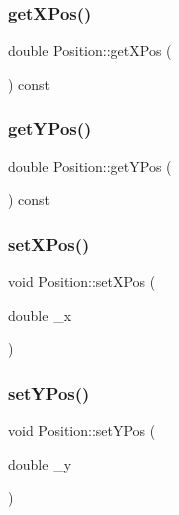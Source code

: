 \subsubsection{\texorpdfstring{get\+X\+Pos()}{getXPos()}}
{\footnotesize\ttfamily double Position\+::get\+X\+Pos (\begin{DoxyParamCaption}{ }\end{DoxyParamCaption}) const}

\mbox{\label{class_position_a9bf258e61c4d01643599c175007254ac}} 
\subsubsection{\texorpdfstring{get\+Y\+Pos()}{getYPos()}}
{\footnotesize\ttfamily double Position\+::get\+Y\+Pos (\begin{DoxyParamCaption}{ }\end{DoxyParamCaption}) const}

\mbox{\label{class_position_a9452ac5b29a317165ea9ee8386b82581}} 
\subsubsection{\texorpdfstring{set\+X\+Pos()}{setXPos()}}
{\footnotesize\ttfamily void Position\+::set\+X\+Pos (\begin{DoxyParamCaption}\item[{double}]{\+\_\+x }\end{DoxyParamCaption})}

\mbox{\label{class_position_ae30f190ecd76be1de484773d9544a7f6}} 
\subsubsection{\texorpdfstring{set\+Y\+Pos()}{setYPos()}}
{\footnotesize\ttfamily void Position\+::set\+Y\+Pos (\begin{DoxyParamCaption}\item[{double}]{\+\_\+y }\end{DoxyParamCaption})}



